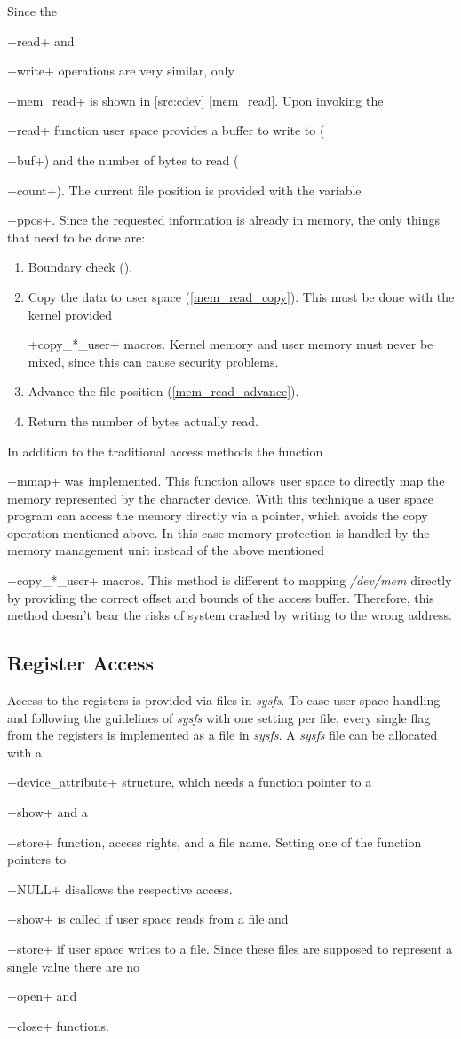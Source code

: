 \documentclass[12pt,a4paper,parskip=full,abstract=true,BCOR=12mm]{scrreprt}
\newcommand*{\SavedLstInline}{}
\DeclareRobustCommand*{\lstinline}{%
  \ifmmode
    \let\SavedBGroup\bgroup
    \def\bgroup{%
      \let\bgroup\SavedBGroup
      \hbox\bgroup
    }%
  \fi
  \SavedLstInline
}
\def\device#1{\mbox{\textit{#1}}}
\begin{document}
Since the \lstinline+read+ and \lstinline+write+ operations are very similar,
only \lstinline+mem_read+ is shown in \cref{src:cdev} \cref{mem_read}. Upon invoking the
\lstinline+read+ function user space provides a buffer to write to (\lstinline+buf+)
and the number of bytes to read (\lstinline+count+). The current file
position is provided with the variable \lstinline+ppos+. Since the requested information
is already in memory, the only things that need to be done are:
\begin{enumerate}
    \item Boundary check ().
    \item Copy the data to user space (\cref{mem_read_copy}). This must be
        done with the kernel provided \lstinline+copy_*_user+ macros. Kernel memory and
        user memory must never be mixed, since this can cause security
        problems\cite{ldd}.
    \item Advance the file position (\cref{mem_read_advance}).
    \item Return the number of bytes actually read.
\end{enumerate}

In addition to the traditional access methods the function \lstinline+mmap+
was implemented. This function allows user space to directly map the memory
represented by the character device. With this technique a user space program
can access the memory directly via a pointer, which avoids the copy operation
mentioned above. In this case memory protection is handled by the memory
management unit instead of the above mentioned \lstinline+copy_*_user+ macros.
This method is different to mapping \device{/dev/mem}
directly by providing the correct offset and bounds of the access buffer.
Therefore, this method doesn't bear the risks of system crashed by writing
to the wrong address.


\subsection{Register Access}
\label{sec:register_access}

Access to the registers is provided via files in \device{sysfs}\cite{sysfs}. To ease
user space handling and following the guidelines of \device{sysfs} with one setting per file,
every single flag from the registers is implemented as a file in \device{sysfs}. A \device{sysfs} file
can be allocated with a \lstinline+device_attribute+ structure, which needs
a function pointer to a \lstinline+show+ and a \lstinline+store+ function, access rights,
and a file name. Setting one of the function pointers to \lstinline+NULL+ disallows the
respective access. \lstinline+show+ is called if user space reads from a file and
\lstinline+store+ if user space writes to a file. Since these files are supposed
to represent a single value there are no \lstinline+open+ and \lstinline+close+
functions.
\end{document}
